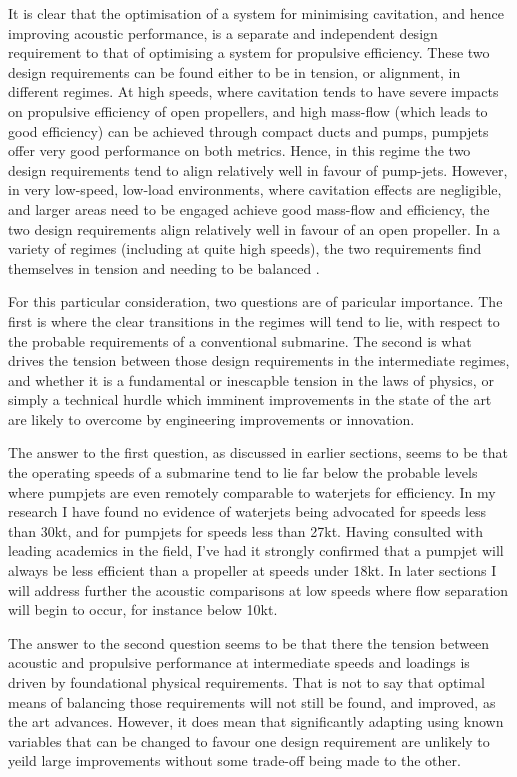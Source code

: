 \documentclass{article}\usepackage[]{graphicx}\usepackage[]{color}
\begin{document}
It is clear that the optimisation of a system for minimising cavitation, and hence improving acoustic performance, is a separate and independent design requirement to that of optimising a system for propulsive efficiency.  These two design requirements can be found either to be in tension, or alignment, in different regimes.  At high speeds, where cavitation tends to have severe impacts on propulsive efficiency of open propellers, and high mass-flow (which leads to good efficiency) can be achieved through compact ducts and pumps, pumpjets offer very good performance on both metrics.  Hence, in this regime the two design requirements tend to align relatively well in favour of pump-jets.  However, in very low-speed, low-load environments, where cavitation effects are negligible, and larger areas need to be engaged achieve good mass-flow and efficiency, the two design requirements align relatively well in favour of an open propeller.  In a variety of regimes (including at quite high speeds), the two requirements find themselves in tension and needing to be balanced \parencite{gearhart1966selection}.

For this particular consideration, two questions are of paricular importance.  The first is where the clear transitions in the regimes will tend to lie, with respect to the probable requirements of a conventional submarine.  The second is what drives the tension between those design requirements in the intermediate regimes, and whether it is a fundamental or inescapble tension in the laws of physics, or simply a technical hurdle which imminent improvements in the state of the art are likely to overcome by engineering improvements or innovation.

The answer to the first question, as discussed in earlier sections, seems to be that the operating speeds of a submarine tend to lie far below the probable levels where pumpjets are even remotely comparable to waterjets for efficiency.  In my research I have found no evidence of waterjets being advocated for speeds less than 30kt, and for pumpjets for speeds less than 27kt.  Having consulted with leading academics in the field, I've had it strongly confirmed that a pumpjet will always be less efficient than a propeller at speeds under 18kt.  In later sections I will address further the acoustic comparisons at low speeds where flow separation will begin to occur, for instance below 10kt.

The answer to the second question seems to be that there the tension between acoustic and propulsive performance at intermediate speeds and loadings is driven by foundational physical requirements.  That is not to say that optimal means of balancing those requirements will not still be found, and improved, as the art advances.  However, it does mean that significantly adapting using known variables that can be changed to favour one design requirement are unlikely to yeild large improvements without some trade-off being made to the other.
\end{document}
